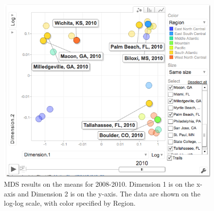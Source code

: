 \documentclass[11pt]{asaproc}
\begin{document}
\begin{figure}[ht]
\begin{framed}
\begin{minipage}[b]{0.45\linewidth}
\end{minipage}
\hspace{0.5cm}
\begin{minipage}[b]{0.45\linewidth}
\centering
\includegraphics[width=\textwidth]{mdsmeans10.png}
\end{minipage}
\hspace{0.5cm}
\begin{minipage}[b]{0.45\linewidth}
\centering
\caption{MDS results on the means for 2008-2010. Dimension 1 is on the
  x-axis and Dimension 2 is on the y-axis. The data are shown on the
  log-log scale, with color specified by Region.}
\label{fig:mdsMCmeans}
\end{minipage}
\end{framed}
\end{figure}

\pagebreak
\end{document}

